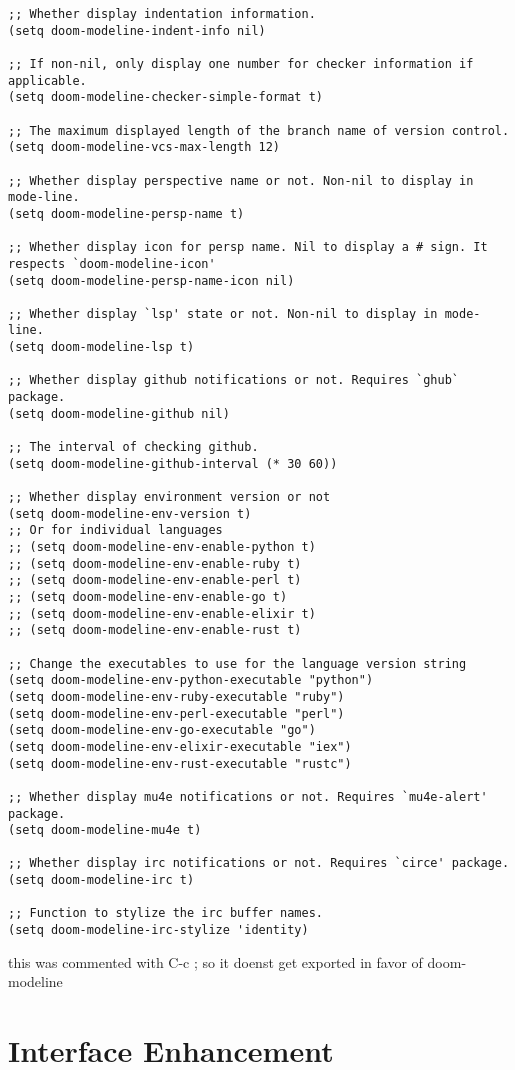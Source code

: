 \documentclass[11pt]{article}
\begin{document}
\begin{verbatim}
;; Whether display indentation information.
(setq doom-modeline-indent-info nil)

;; If non-nil, only display one number for checker information if applicable.
(setq doom-modeline-checker-simple-format t)

;; The maximum displayed length of the branch name of version control.
(setq doom-modeline-vcs-max-length 12)

;; Whether display perspective name or not. Non-nil to display in mode-line.
(setq doom-modeline-persp-name t)

;; Whether display icon for persp name. Nil to display a # sign. It respects `doom-modeline-icon'
(setq doom-modeline-persp-name-icon nil)

;; Whether display `lsp' state or not. Non-nil to display in mode-line.
(setq doom-modeline-lsp t)

;; Whether display github notifications or not. Requires `ghub` package.
(setq doom-modeline-github nil)

;; The interval of checking github.
(setq doom-modeline-github-interval (* 30 60))

;; Whether display environment version or not
(setq doom-modeline-env-version t)
;; Or for individual languages
;; (setq doom-modeline-env-enable-python t)
;; (setq doom-modeline-env-enable-ruby t)
;; (setq doom-modeline-env-enable-perl t)
;; (setq doom-modeline-env-enable-go t)
;; (setq doom-modeline-env-enable-elixir t)
;; (setq doom-modeline-env-enable-rust t)

;; Change the executables to use for the language version string
(setq doom-modeline-env-python-executable "python")
(setq doom-modeline-env-ruby-executable "ruby")
(setq doom-modeline-env-perl-executable "perl")
(setq doom-modeline-env-go-executable "go")
(setq doom-modeline-env-elixir-executable "iex")
(setq doom-modeline-env-rust-executable "rustc")

;; Whether display mu4e notifications or not. Requires `mu4e-alert' package.
(setq doom-modeline-mu4e t)

;; Whether display irc notifications or not. Requires `circe' package.
(setq doom-modeline-irc t)

;; Function to stylize the irc buffer names.
(setq doom-modeline-irc-stylize 'identity)
\end{verbatim}


this was commented with C-c ; so it doenst get exported in favor of doom-modeline
\section*{Interface Enhancement}
\label{sec:org7a3ef4f}
\end{document}
